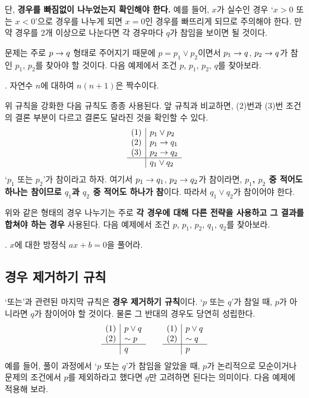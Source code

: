 단, \textbf{경우를 빠짐없이 나누었는지 확인해야 한다.} 예를 들어, \(x\)가 실수인 경우 `\(x > 0\) 또는 \(x < 0\)'으로 경우를 나누게 되면 \(x = 0\)인 경우를 빠뜨리게 되므로 주의해야 한다. 만약 경우를 2개 이상으로 나눈다면 각 경우마다 \(q\)가 참임을 보이면 될 것이다.

문제는 주로 \(p \rightarrow q\) 형태로 주어지기 때문에 \(p = p_1 \vee p_2\)이면서 \(p_1 \rightarrow q\), \(p_2 \rightarrow q\)가 참인 \(p_1\), \(p_2\)를 찾아야 할 것이다. 다음 예제에서 조건 \(p\), \(p_1\), \(p_2\), \(q\)를 찾아보라.

\bigskip

\ex. 자연수 \(n\)에 대하여 \(n(n + 1)\)은 짝수이다.

\pagebreak

위 규칙을 강화한 다음 규칙도 종종 사용된다. 앞 규칙과 비교하면, (2)번과 (3)번 조건의 결론 부분이 다르고 결론도 달라진 것을 확인할 수 있다.
\[
    \begin{array}{c|l}
        (1) & p_1 \vee p_2 \\ (2) & p_1 \rightarrow q_1 \\ (3) & p_2 \rightarrow q_2 \\\hline & q_1 \vee q_2
    \end{array}
\]
`\(p_1\) 또는 \(p_2\)'가 참이라고 하자. 여기서 \(p_1 \rightarrow q_1\), \(p_2 \rightarrow q_2\)가 참이라면, \textbf{\(p_1\), \(p_2\) 중 적어도 하나는 참이므로 \(q_1\)과 \(q_2\) 중 적어도 하나가 참}이다. 따라서 \(q_1 \vee q_2\)가 참이어야 한다.

위와 같은 형태의 경우 나누기는 주로 \textbf{각 경우에 대해 다른 전략을 사용하고 그 결과를 합쳐야 하는 경우} 사용된다. 다음 예제에서 조건 \(p\), \(p_1\), \(p_2\), \(q_1\), \(q_2\)를 찾아보라.

\bigskip

\ex. \(x\)에 대한 방정식 \(ax + b = 0\)을 풀어라.

\pagebreak

\subsection{경우 제거하기 규칙}

`또는'과 관련된 마지막 규칙은 \textbf{경우 제거하기 규칙}이다. `\(p\) 또는 \(q\)'가 참일 때, \(p\)가 아니라면 \(q\)가 참이어야 할 것이다. 물론 그 반대의 경우도 당연히 성립한다.
\[
    \begin{array}{c|l}
        (1) & p \vee q \\ (2) & \sim p \\\hline & q
    \end{array}
    \qquad
    \begin{array}{c|l}
        (1) & p \vee q \\ (2) & \sim q \\\hline & p
    \end{array}
\]
예를 들어, 풀이 과정에서 `\(p\) 또는 \(q\)'가 참임을 알았을 때, \(p\)가 논리적으로 모순이거나 문제의 조건에서 \(p\)를 제외하라고 했다면 \(q\)만 고려하면 된다는 의미이다. 다음 예제에 적용해 보라.

